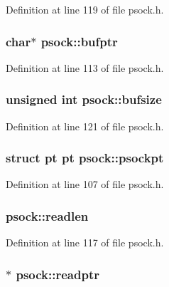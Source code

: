 Definition at line 119 of file psock.h.

\hypertarget{structpsock_ac3d1bfbb1abde31973c015de97ce2f84}{
\subsubsection[{bufptr}]{\setlength{\rightskip}{0pt plus 5cm}char$\ast$ {\bf psock::bufptr}}}
\label{structpsock_ac3d1bfbb1abde31973c015de97ce2f84}


Definition at line 113 of file psock.h.

\hypertarget{structpsock_aa6bfaf327ce839ba70accd71014398d0}{
\subsubsection[{bufsize}]{\setlength{\rightskip}{0pt plus 5cm}unsigned int {\bf psock::bufsize}}}
\label{structpsock_aa6bfaf327ce839ba70accd71014398d0}


Definition at line 121 of file psock.h.

\hypertarget{structpsock_a17aacf7c5e2046c1f3ab50faa1b2f7eb}{
\subsubsection[{psockpt}]{\setlength{\rightskip}{0pt plus 5cm}struct {\bf pt} {\bf pt} {\bf psock::psockpt}}}
\label{structpsock_a17aacf7c5e2046c1f3ab50faa1b2f7eb}


Definition at line 107 of file psock.h.

\hypertarget{structpsock_aa408ca8630154ebd039f37a828399f7b}{
\subsubsection[{readlen}]{ {\bf psock::readlen}}}
\label{structpsock_aa408ca8630154ebd039f37a828399f7b}


Definition at line 117 of file psock.h.

\hypertarget{structpsock_ab973f2e16c2883a8a0164d716cce5a31}{
\subsubsection[{readptr}]{$\ast$ {\bf psock::readptr}}}
\label{structpsock_ab973f2e16c2883a8a0164d716cce5a31}


